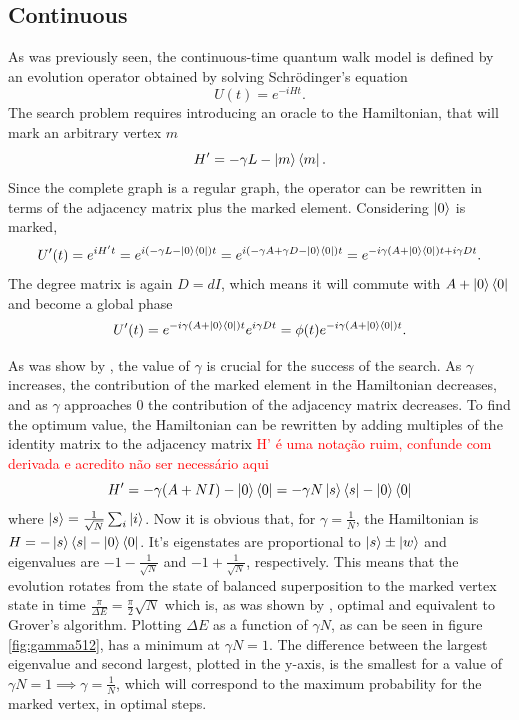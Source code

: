 \documentclass[../../dissertation.tex]{subfiles}
\begin{document}
\subsection{Continuous}
As was previously seen, the continuous-time quantum walk model is defined by an evolution operator obtained by solving Schrödinger's equation
\begin{equation}
	U(t) = e^{-iHt}.
\end{equation}
The search problem requires introducing an oracle to the Hamiltonian, that will mark an arbitrary vertex $m$ %
\begin{equation}
	H' = -\gamma L - \ket{m}\bra{m}.
\end{equation}
Since the complete graph is a regular graph, the operator can be rewritten in terms of the adjacency matrix plus the marked element. Considering $\ket{0}$ is marked,
\begin{equation}
	U'(t) = e^{iH't} = e^{i(-\gamma L - \ket{0}\bra{0})t} = e^{i(-\gamma A + \gamma D - \ket{0}\bra{0})t} = e^{-i\gamma(A+\ket{0}\bra{0})t + i\gamma D t}.
\end{equation}
The degree matrix is again $D=dI$, which means it will commute with $A+\ket{0}\bra{0}$ and become a global phase
\begin{equation}
	U'(t) = e^{-i\gamma(A+\ket{0}\bra{0})t}e^{i\gamma D t} = \phi(t)e^{-i\gamma(A+\ket{0}\bra{0})t}.
\end{equation}\par
As was show by \cite{zalka1999}, the value of $\gamma$ is crucial for the success of the search. As $\gamma$ increases, the contribution of the marked element in the Hamiltonian decreases, and as $\gamma$ approaches $0$ the contribution of the adjacency matrix decreases. To find the optimum value, the Hamiltonian can be rewritten by adding multiples of the identity matrix to the adjacency matrix \textcolor{red}{H' é uma notação ruim, confunde com derivada e acredito não ser necessário aqui}
\begin{equation}
	H' = -\gamma(A+NI) - \ket{0}\bra{0} = -\gamma N\ket{s}\bra{s} - \ket{0}\bra{0}
\end{equation}
where $\ket{s} = \frac{1}{\sqrt{N}}\sum_i \ket{i}$. Now it is obvious that, for $\gamma = \frac{1}{N}$, the Hamiltonian is $H = -\ket{s}\bra{s} - \ket{0}\bra{0}$. It's eigenstates are proportional to $\ket{s}\pm\ket{w}$ and eigenvalues are $-1 - \frac{1}{\sqrt{N}}$ and $-1 + \frac{1}{\sqrt{N}}$, respectively. This means that the evolution rotates from the state of balanced superposition to the marked vertex state in time $\frac{\pi}{\Delta E} = \frac{\pi}{2}\sqrt{N}$ which is, as was shown by \cite{zalka1999}, optimal and equivalent to Grover's algorithm. Plotting $\Delta E$ as a function of $\gamma N$, as can be seen in figure \ref{fig:gamma512}, has a minimum at $\gamma N =1$. The difference between the largest eigenvalue and second largest, plotted in the y-axis, is the smallest for a value of $\gamma N = 1 \implies \gamma =\frac{1}{N}$, which will correspond to the maximum probability for the marked vertex, in optimal steps.
\end{document}
